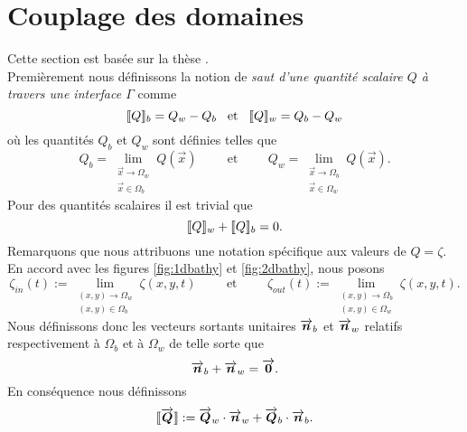 \section{Couplage des domaines}
\noindent Cette section est basée sur la thèse \citet{bosi_spectral_2019}.\\

\noindent Premièrement nous définissons la notion de \textit{saut d'une quantité scalaire $Q$ à travers une interface $\Gamma$} comme
\begin{equation}
	 \llbracket Q \rrbracket_{b} = Q_w - Q_b \hspace{3mm}\text{et}\hspace{3mm}\llbracket Q \rrbracket_{w} = Q_b - Q_w
\end{equation}
où les quantités $Q_b$ et $Q_w$ sont définies telles que
\begin{equation}
	Q_b = \lim_{\substack{\vec{x}\to\Omega_w \\ \vec{x}\in\Omega_b}} Q(\vec{x})\hspace{1cm}\text{et}\hspace{1cm} Q_w = \lim_{\substack{\vec{x}\to\Omega_b \\ \vec{x}\in\Omega_w}} Q(\vec{x}).
\end{equation}
Pour des quantités scalaires il est trivial que
\begin{equation}
	\llbracket Q \rrbracket_{w} + \llbracket Q \rrbracket_{b} = 0.
\end{equation}
Remarquons que nous attribuons une notation spécifique aux valeurs de $Q = \zeta$. En accord avec les figures \ref{fig:1dbathy} et \ref{fig:2dbathy}, nous posons
\begin{equation}
	\zeta_{in}(t) := \lim_{\substack{\left(x, y\right)\to\Omega_w \\ \left(x, y\right)\in\Omega_b}} \zeta(x, y, t)\hspace{1cm}\text{et}\hspace{1cm} \zeta_{out}(t) := \lim_{\substack{\left(x, y\right)\to\Omega_b \\ \left(x, y\right)\in\Omega_w}} \zeta(x, y, t).
\end{equation}
Nous définissons donc les vecteurs sortants unitaires $\overrightarrow{\boldsymbol{n}}_b$ et $\overrightarrow{\boldsymbol{n}}_w$ relatifs respectivement à $\Omega_b$ et à $\Omega_w$ de telle sorte que
\begin{equation}
	\overrightarrow{\boldsymbol{n}}_b + \overrightarrow{\boldsymbol{n}}_w = \overrightarrow{\boldsymbol{0}}.
\end{equation}
En conséquence nous définissons
\begin{equation}
	\llbracket \overrightarrow{\boldsymbol{Q}} \rrbracket := \overrightarrow{\boldsymbol{Q}}_w\cdot\overrightarrow{\boldsymbol{n}}_w + \overrightarrow{\boldsymbol{Q}}_b\cdot\overrightarrow{\boldsymbol{n}}_b.
\end{equation}

